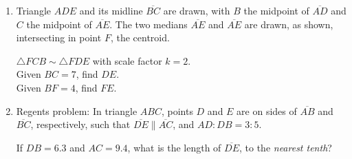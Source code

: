 \documentclass[12pt, twoside]{article}
\begin{document}
\begin{enumerate}
\newpage
\item Triangle $ADE$ and its midline $\overline{BC}$ are drawn, with $B$ the midpoint of $\overline{AD}$ and $C$ the midpoint of $\overline{AE}$. The two medians $\overline{AE}$ and $\overline{AE}$ are drawn, as shown, intersecting in point $F$, the centroid.
\begin{multicols}{2}
  $\triangle FCB \sim \triangle FDE$ with scale factor $k=2$.\\[0.25cm]
  Given $BC=7$, find $DE$. \\[0.25cm] Given $BF=4$, find $FE$. \vspace{1cm}
  \begin{center}
    \end{center}
\end{multicols} \vspace{2cm}

\item Regents problem: In triangle $ABC$, points $D$ and $E$ are on sides of $\overline{AB}$ and $\overline{BC}$, respectively, such that $\overline{DE} \parallel \overline{AC}$, and $AD:DB = 3:5$.
\begin{center}
\end{center}
If $DB=6.3$ and $AC=9.4$, what is the length of $\overline{DE}$, to the \emph{nearest tenth}?


\end{enumerate}
\end{document}
